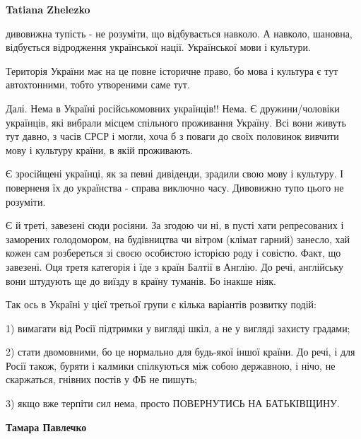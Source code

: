 \begin{itemize}
\begin{itemize}
 
\textbf{Tatiana Zhelezko} 

дивовижна тупість - не розуміти, що відбувається навколо. А навколо, шановна,
відбується відродження української нації. Української мови і культури.

Територія України має на це повне історичне право, бо мова і культура є тут
автохтонними, тобто утвореними саме тут. 

Далі. Нема в Україні російськомовних українців!! Нема. Є дружини/чоловіки
українців, які вибрали місцем спільного проживання Україну. Всі вони живуть тут
давно, з часів СРСР і могли, хоча б з поваги до своїх половинок вивчити мову і
культуру країни, в якій проживають. 

Є зросійщені українці, як за певні дивіденди, зрадили свою мову і культуру. І
поверненя їх до українства - справа виключно часу. Дивовижно тупо цього не
розуміти. 

Є й треті, завезені сюди росіяни. За згодою чи ні, в пусті хати репресованих і
заморених голодомором, на будівництва чи вітром (клімат гарний) занесло, хай
кожен сам розбереться зі своєю особистою історією роду і совістю.  Факт, що
завезені. Оця третя категорія і їде з країн Балтії в Англію. До речі,
англійську вони штудують ще до виїзду в країну туманів. Бо інакше ніяк. 

Так ось в Україні у цієї третьої групи є кілька варіантів розвитку подій: 

1) вимагати від Росії підтримки у вигляді шкіл, а не у вигляді захисту градами; 

2) стати двомовними, бо це нормально для будь-якої іншої країни. До речі, і для
Росії також, буряти і калмики спілкуються між собою державною, і нічо, не
скаржаться, гнівних постів у ФБ не пишуть; 

3) якщо вже терпіти сил нема, просто ПОВЕРНУТИСЬ НА БАТЬКІВЩИНУ.

 
\textbf{Тамара Павлечко} 


\end{itemize}
\end{itemize}
